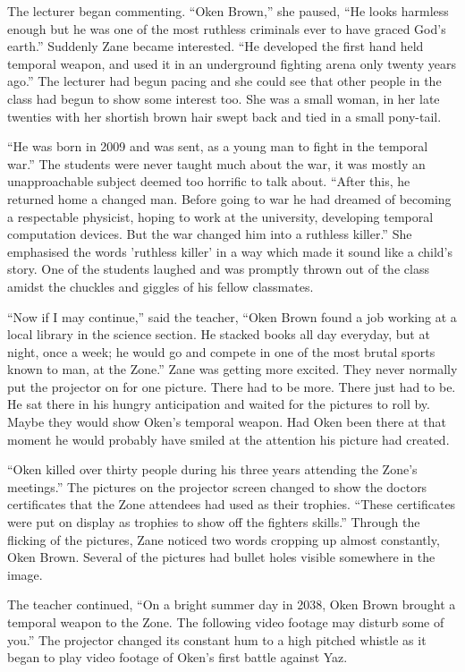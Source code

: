 The lecturer began commenting.  ``Oken Brown,'' she paused, ``He looks harmless enough but he was one of the most ruthless criminals ever to have graced God's earth.''  Suddenly Zane became interested.  ``He developed the first hand held temporal weapon, and used it in an underground fighting arena only twenty years ago.''  The lecturer had begun pacing and she could see that other people in the class had begun to show some interest too.  She was a small woman, in her late twenties with her shortish brown hair swept back and tied in a small pony-tail.

``He was born in 2009 and was sent, as a young man to fight in the temporal war.''  The students were never taught much about the war, it was mostly an unapproachable subject deemed too horrific to talk about.  ``After this, he returned home a changed man.  Before going to war he had dreamed of becoming a respectable physicist, hoping to work at the university, developing temporal computation devices.  But the war changed him into a ruthless killer.''  She emphasised the words 'ruthless killer' in a way which made it sound like a child's story.   One of the students laughed and was promptly thrown out of the class amidst the chuckles and giggles of his fellow classmates.

``Now if I may continue,'' said the teacher, ``Oken Brown found a job working at a local library in the science section.  He stacked books all day everyday, but at night, once a week; he would go and compete in one of the most brutal sports known to man, at the Zone.''  Zane was getting more excited.  They never normally put the projector on for one picture.  There had to be more.  There just had to be.  He sat there in his hungry anticipation and waited for the pictures to roll by.  Maybe they would show Oken's temporal weapon.  Had Oken been there at that moment he would probably have smiled at the attention his picture had created.

``Oken killed over thirty people during his three years attending the Zone's meetings.''  The pictures on the projector screen changed to show the doctors certificates that the Zone attendees had used as their trophies.  ``These certificates were put on display as trophies to show off the fighters skills.''  Through the flicking of the pictures, Zane noticed two words cropping up almost constantly, Oken Brown.  Several of the pictures had bullet holes visible somewhere in the image.

The teacher continued, ``On a bright summer day in 2038, Oken Brown brought a temporal weapon to the Zone.  The following video footage may disturb some of you.''  The projector changed its constant hum to a high pitched whistle as it began to play video footage of Oken's first battle against Yaz.

